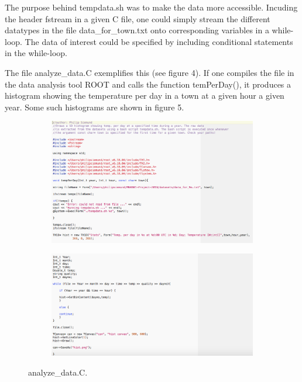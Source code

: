 \documentclass{article}
\begin{document}
The purpose behind tempdata.sh was to make the data more accessible. Incuding the header fstream in a given C file, one could simply stream the different datatypes in the file data\_for\_town.txt onto corresponding variables in a while-loop. The data of interest could be specified by including conditional statements in the while-loop.

The file analyze\_data.C exemplifies this (see figure 4). If one compiles the file in the data analysis tool ROOT and calls the function temPerDay(), it produces a histogram showing the temperature per day in a town at a given hour a given year. Some such histograms are shown in figure 5. 
\begin{figure}[H]
\centering
\begin{subfigure}[h]{1\textwidth}
\centering
\includegraphics[width=\textwidth]{CodeAn1.png} 
\caption{} \label{figA}
\end{subfigure}

\begin{subfigure}[h]{1\textwidth}
\centering
\includegraphics[width=\textwidth]{CodeAn2.png} 
\caption{} \label{figB}
\end{subfigure}
\caption{analyze\_data.C.}
\end{figure}
\end{document}

